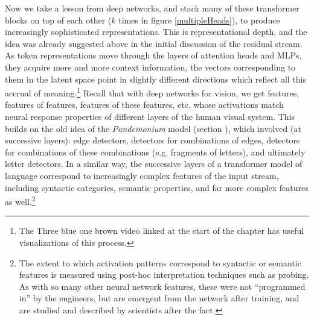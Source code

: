 Now we take a lesson from deep networks, and stack many of these transformer blocks on top of each other ($k$ times in figure \ref{multipleHeads}), to produce increasingly sophisticated representations. This is representational depth, and the idea was already suggested above in the initial discussion of the residual stream.  As token representations move through the layers of attention heads and MLPs, they acquire more and more context information, the vectors corresponding to them in the latent space point in slightly different directions which reflect all this accrual of meaning.\footnote{The Three blue one brown video linked at the start of the chapter has useful visualizations of this process.}  Recall that with deep networks for vision, we get features, features of features, features of these features, etc. whose activations match neural response properties of different layers of the human visual system. This builds on the old idea of the \emph{Pandemonium} model (section ), which involved (at successive layers): edge detectors, detectors for combinations of edges, detectors for combinations of these combinations (e.g. fragments of letters), and ultimately letter detectors. In a similar way, the successive layers of a transformer model of language correspond to increasingly complex features of the input stream, including syntactic categories, semantic properties, and far more complex features as well.\footnote{The extent to which activation patterns correspond to syntactic or semantic features is measured using post-hoc interpretation techniques such as probing. As with so many other neural network features, these were not ``programmed in'' by the engineers, but are emergent from the network after training, and are studied and described by scientists after the fact.}



